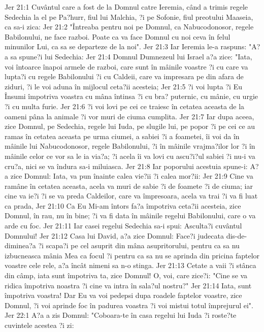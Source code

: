Jer 21:1  Cuvântul care a fost de la Domnul catre Ieremia, când a trimis regele Sedechia la el pe Pa?hurr, fiul lui Malchia, ?i pe Sofonie, fiul preotului Maaseia, ca sa-i zica:
Jer 21:2  "Întreaba pentru noi pe Domnul, ca Nabucodonosor, regele Babilonului, ne face razboi. Poate ca va face Domnul cu noi ceva în felul minunilor Lui, ca sa se departeze de la noi".
Jer 21:3  Iar Ieremia le-a raspuns: "A?a sa spune?i lui Sedechia:
Jer 21:4  Domnul Dumnezeul lui Israel a?a zice: "Iata, voi întoarce înapoi armele de razboi, care sunt în mâinile voastre ?i cu care va lupta?i cu regele Babilonului ?i cu Caldeii, care va impresara pe din afara de ziduri, ?i le voi aduna în mijlocul ceta?ii acesteia;
Jer 21:5  ?i voi lupta ?i Eu Însumi împotriva voastra cu mâna întinsa ?i cu bra? puternic, cu mânie, cu urgie ?i cu multa furie.
Jer 21:6  ?i voi lovi pe cei ce traiesc în cetatea aceasta de la oameni pâna la animale ?i vor muri de ciuma cumplita.
Jer 21:7  Iar dupa aceea, zice Domnul, pe Sedechia, regele lui Iuda, pe slugile lui, pe popor ?i pe cei ce au ramas în cetatea aceasta pe urma ciumei, a sabiei ?i a foametei, îi voi da în mâinile lui Nabucodonosor, regele Babilonului, ?i în mâinile vrajma?ilor lor ?i în mâinile celor ce vor sa le ia via?a; ?i acela îi va lovi cu ascu?i?ul sabiei ?i nu-i va cru?a, nici se va îndura sa-i miluiasca.
Jer 21:8  Iar poporului acestuia spune-i: A?a zice Domnul: Iata, va pun înainte calea vie?ii ?i calea mor?ii:
Jer 21:9  Cine va ramâne în cetatea aceasta, acela va muri de sabie ?i de foamete ?i de ciuma; iar cine va ie?i ?i se va preda Caldeilor, care va împresoara, acela va trai ?i va fi luat ca prada,
Jer 21:10  Ca Eu Mi-am întors fa?a împotriva ceta?ii acesteia, zice Domnul, în rau, nu în bine; ?i va fi data în mâinile regelui Babilonului, care o va arde cu foc.
Jer 21:11  Iar casei regelui Sedechia sa-i spui: Asculta?i cuvântul Domnului!
Jer 21:12  Casa lui David, a?a zice Domnul: Face?i judecata dis-de-diminea?a ?i scapa?i pe cel asuprit din mâna asupritorului, pentru ca sa nu izbucneasca mânia Mea ca focul ?i pentru ca sa nu se aprinda din pricina faptelor voastre cele rele, a?a încât nimeni sa n-o stinga.
Jer 21:13  Cetate a vaii ?i stânca din câmp, iata sunt împotriva ta, zice Domnul! O, voi, care zice?i: "Cine se va ridica împotriva noastra ?i cine va intra în sala?ul nostru?"
Jer 21:14  Iata, sunt împotriva voastra! Dar Eu va voi pedepsi dupa roadele faptelor voastre, zice Domnul, ?i voi aprinde foc în padurea voastra ?i voi mistui totul împrejurul ei".
Jer 22:1  A?a a zis Domnul: "Coboara-te în casa regelui lui Iuda ?i roste?te cuvintele acestea ?i zi:
